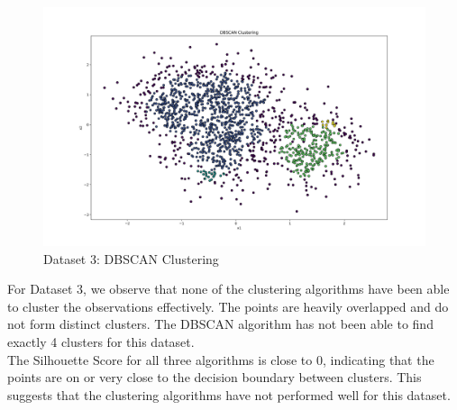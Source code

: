 \begin{figure}[H]
	\centering
	\includegraphics[width=0.75\linewidth]{Images/Clusters-5-v2-DBSCAN Clustering.png}
	\caption{Dataset 3: DBSCAN Clustering}
	\label{fig:clusters-5-v2-dbscan-clustering}
\end{figure}

For Dataset 3, we observe that none of the clustering algorithms have been able to cluster the observations effectively. The points are heavily overlapped and do not form distinct clusters. The DBSCAN algorithm has not been able to find exactly 4 clusters for this dataset. \\

The Silhouette Score for all three algorithms is close to 0, indicating that the points are on or very close to the decision boundary between clusters. This suggests that the clustering algorithms have not performed well for this dataset.

\clearpage